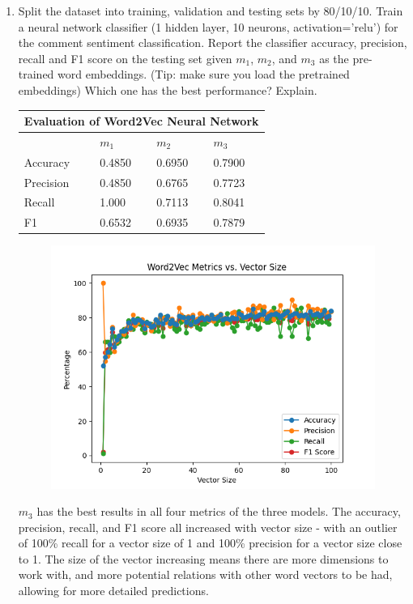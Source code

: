 \documentclass[conference]{IEEEtran}
\begin{document}
\begin{enumerate}
\item Split the dataset into training, validation and testing sets by 80/10/10. Train a neural network classifier (1 hidden layer, 10 neurons, activation='relu') for the comment sentiment classification. Report the classifier accuracy, precision, recall and F1 score on the testing set given $m_1$, $m_2$, and $m_3$ as the pre-trained word embeddings. (Tip: make sure you load the pretrained embeddings) Which one has the best performance? Explain.
\begin{table}[H]
\centering
\begin{tabular}{|llll|}
\hline
\multicolumn{4}{|l|}{Evaluation of Word2Vec Neural Network}                                          \\ \hline
\multicolumn{1}{|l|}{}          & \multicolumn{1}{l|}{$m_1$}  & \multicolumn{1}{l|}{$m_2$}  & $m_3$  \\ \hline
\multicolumn{1}{|l|}{Accuracy}  & \multicolumn{1}{l|}{0.4850} & \multicolumn{1}{l|}{0.6950} & 0.7900 \\ \hline
\multicolumn{1}{|l|}{Precision} & \multicolumn{1}{l|}{0.4850} & \multicolumn{1}{l|}{0.6765} & 0.7723 \\ \hline
\multicolumn{1}{|l|}{Recall}    & \multicolumn{1}{l|}{1.000} & \multicolumn{1}{l|}{0.7113} & 0.8041 \\ \hline
\multicolumn{1}{|l|}{F1}        & \multicolumn{1}{l|}{0.6532} & \multicolumn{1}{l|}{0.6935} & 0.7879 \\ \hline
\end{tabular}
\end{table}
\begin{figure}[H]
\centering
\includegraphics[width=0.4\columnwidth]{w2v_nn_vector_size_plot.png}
\end{figure}
$m_3$ has the best results in all four metrics of the three models.  The accuracy, precision, recall, and F1 score all increased with vector size - with an outlier of 100\% recall for a vector size of 1 and 100\% precision for a vector size close to 1. The size of the vector increasing means there are more dimensions to work with, and more potential relations with other word vectors to be had, allowing for more detailed predictions.\\


\end{enumerate}
\end{document}
